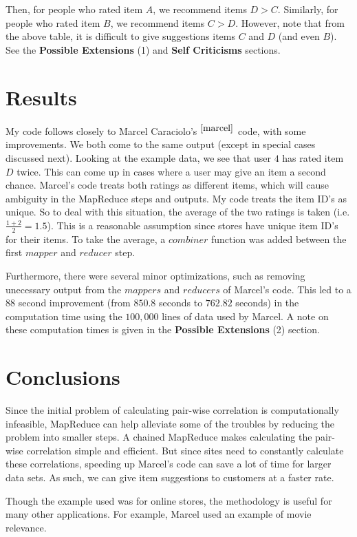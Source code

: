 \documentclass{article}
\begin{document}
Then, for people who rated item $A$, we recommend items $D>C$. Similarly, for people who rated item $B$, we recommend items $C>D$. However, note that from the above table, it is difficult to give suggestions items $C$ and $D$ (and even $B$). See the \textbf{Possible Extensions} (1) and \textbf{Self Criticisms} sections.

\section{Results}
My code follows closely to Marcel Caraciolo's $^{\cite{marcel}}$ code, with some improvements. We both come to the same output (except in special cases discussed next). Looking at the example data, we see that user $4$ has rated item $D$ twice. This can come up in cases where a user may give an item a second chance. Marcel's code treats both ratings as different items, which will cause ambiguity in the MapReduce steps and outputs. My code treats the item ID's as unique. So to deal with this situation, the average of the two ratings is taken (i.e. $\frac{1+2}{2}=1.5$). This is a reasonable assumption since stores have unique item ID's for their items. To take the average, a $combiner$ function was added between the first $mapper$ and $reducer$ step.

Furthermore, there were several minor optimizations, such as removing unecessary output from the $mappers$ and $reducers$ of Marcel's code. This led to a $88$ second improvement (from $850.8$ seconds to $762.82$ seconds) in the computation time using the $100,000$ lines of data used by Marcel. A note on these computation times is given in the \textbf{Possible Extensions} (2) section.

\section{Conclusions}
Since the initial problem of calculating pair-wise correlation is computationally infeasible, MapReduce can help alleviate some of the troubles by reducing the problem into smaller steps. A chained MapReduce makes calculating the pair-wise correlation simple and efficient. But since sites need to constantly calculate these correlations, speeding up Marcel's code can save a lot of time for larger data sets. As such, we can give item suggestions to customers at a faster rate.

Though the example used was for online stores, the methodology is useful for many other applications. For example, Marcel used an example of movie relevance.
\end{document}
